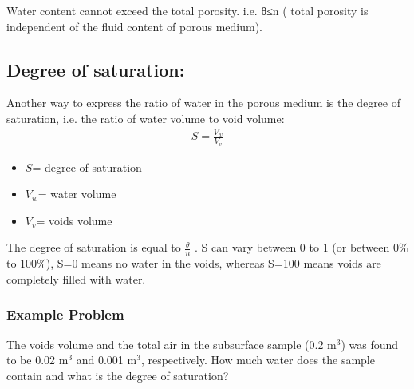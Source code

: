 \documentclass[letterpaper,10pt,english]{sphinxmanual}
\begin{document}
Water content cannot exceed the total porosity. i.e. θ≤n ( total porosity is independent of the fluid content of porous medium).


\subsection{Degree of saturation:}
\label{\detokenize{contents/flow/lecture_02/12_subsurface_structure:degree-of-saturation}}
Another way to express the ratio of water in the porous medium is the degree of saturation, i.e. the ratio of water volume to void volume:
\begin{equation*}
\begin{split}{S}=\frac{V_{w}}{V_{v}}\end{split}
\end{equation*}\begin{itemize}
\item {} 
\({S}\)= degree of saturation

\item {} 
\({V_{w}}\)= water volume

\item {} 
\({V_{v}}\)= voids volume

\end{itemize}

The degree of saturation is equal to \(\frac{θ}{n}\) . S can vary between 0 to 1 (or between 0\% to 100\%), S=0 means no water in the voids, whereas S=100 means voids are completely filled with water.


\subsubsection{Example Problem}
\label{\detokenize{contents/flow/lecture_02/12_subsurface_structure:id1}}
The voids volume and the total air in the subsurface sample (0.2 m\(^3\)) was found to be 0.02 m\(^3\) and 0.001 m\(^3\), respectively. How much water does the sample contain and what is the degree of saturation?
\end{document}
